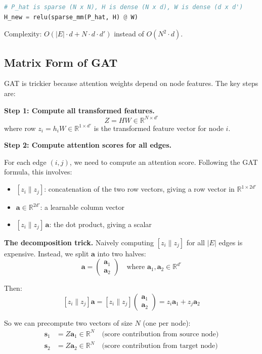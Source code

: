 \begin{notechapter}
\begin{lstlisting}[style=pythonstyle, language=Python]
# P_hat is sparse (N x N), H is dense (N x d), W is dense (d x d')
H_new = relu(sparse_mm(P_hat, H) @ W)
\end{lstlisting}

Complexity: $O(|E| \cdot d + N \cdot d \cdot d')$ instead of $O(N^2 \cdot d)$.

\subsection{Matrix Form of GAT}

GAT is trickier because attention weights depend on node features. The 
key steps are:

\textbf{Step 1: Compute all transformed features.}
\[
Z = H W \in \mathbb{R}^{N \times d'}
\]
where row $z_i = h_i W \in \mathbb{R}^{1 \times d'}$ is the transformed 
feature vector for node $i$.

\textbf{Step 2: Compute attention scores for all edges.}

For each edge $(i,j)$, we need to compute an attention score. Following 
the GAT formula, this involves:
\begin{itemize}
    \item $[z_i \| z_j]$: concatenation of the two row vectors, giving 
          a row vector in $\mathbb{R}^{1 \times 2d'}$
    \item $\mathbf{a} \in \mathbb{R}^{2d'}$: a learnable column vector
    \item $[z_i \| z_j] \, \mathbf{a}$: the dot product, giving a scalar
\end{itemize}

\textbf{The decomposition trick.} Naively computing $[z_i \| z_j]$ for 
all $|E|$ edges is expensive. Instead, we split $\mathbf{a}$ into two 
halves:
\[
\mathbf{a} = \begin{pmatrix} \mathbf{a}_1 \\ \mathbf{a}_2 \end{pmatrix}
\quad \text{where } \mathbf{a}_1, \mathbf{a}_2 \in \mathbb{R}^{d'}
\]

Then:
\[
[z_i \| z_j] \mathbf{a} = [z_i \| z_j] \begin{pmatrix} \mathbf{a}_1 \\ \mathbf{a}_2 \end{pmatrix}
= z_i \mathbf{a}_1 + z_j \mathbf{a}_2
\]

So we can precompute two vectors of size $N$ (one per node):
\begin{align*}
\mathbf{s}_1 &= Z \mathbf{a}_1 \in \mathbb{R}^{N} \quad \text{(score contribution from source node)} \\
\mathbf{s}_2 &= Z \mathbf{a}_2 \in \mathbb{R}^{N} \quad \text{(score contribution from target node)}
\end{align*}


\end{notechapter}
